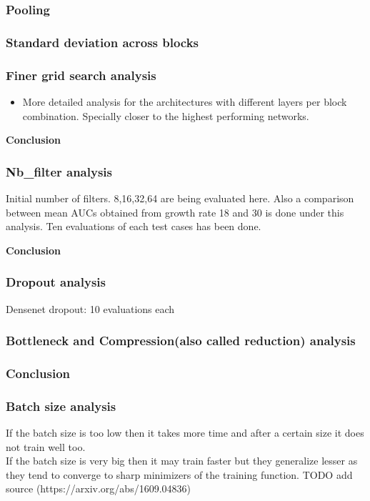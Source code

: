 \subsubsection{Pooling}


\subsubsection{Standard deviation across blocks}

\subsubsection{Finer grid search analysis}
\begin{itemize}
 \item More detailed analysis for the architectures with different layers per block combination. Specially closer to the highest performing networks.
\end{itemize}

\textbf{Conclusion}

\subsubsection{Nb\_filter analysis}
Initial number of filters. 8,16,32,64 are being evaluated here. Also a comparison between mean AUCs obtained from growth rate 18 and 30 is done under this analysis. Ten evaluations of each test cases has been done.

\textbf{Conclusion}

\subsubsection{Dropout analysis}
Densenet dropout: 10 evaluations each \\


\subsubsection{Bottleneck and Compression(also called reduction) analysis}

\subsubsection{Conclusion}



\subsubsection{Batch size analysis}
If the batch size is too low then it takes more time and after a certain size it does not train well too.\\
If the batch size is very big then it may train faster but they generalize lesser as they tend to converge to sharp minimizers of the training function.
TODO add source (https://arxiv.org/abs/1609.04836) 

